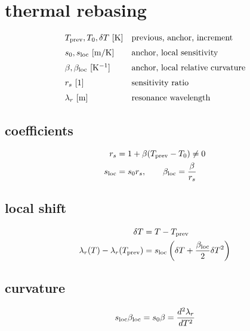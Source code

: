 \section*{thermal rebasing}
\[
\begin{array}{ll}T_{\rm prev},T_0,\delta T\ [\mathrm K]&\text{previous, anchor, increment}\\[0.6em]s_0,s_{\rm loc}\ [\mathrm{m/K}]&\text{anchor, local sensitivity}\\[0.6em]\beta,\beta_{\rm loc}\ [\mathrm{K^{-1}}]&\text{anchor, local relative curvature}\\[0.6em]r_s\ [1]&\text{sensitivity ratio}\\[0.6em]\lambda_r\ [\mathrm m]&\text{resonance wavelength}\end{array}
\]
\subsection*{coefficients}
\[
\displaystyle \begin{aligned}r_s&=1+\beta(T_{\rm prev}-T_0)\ne0\\s_{\rm loc}&=s_0r_s,\qquad\beta_{\rm loc}=\frac{\beta}{r_s}\end{aligned}
\]
\subsection*{local shift}
\[
\displaystyle \begin{aligned}\delta T&=T-T_{\rm prev}\\\lambda_r(T)-\lambda_r(T_{\rm prev})&=s_{\rm loc}\left(\delta T+\frac{\beta_{\rm loc}}2\delta T^2\right)\end{aligned}
\]
\subsection*{curvature}
\[
\displaystyle s_{\rm loc}\beta_{\rm loc}=s_0\beta=\frac{d^2\lambda_r}{dT^2}
\]
